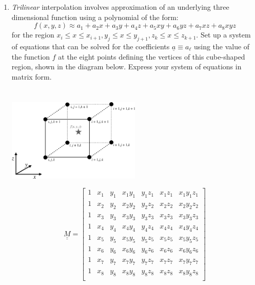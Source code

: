 \documentclass{article}
\begin{document}
\begin{enumerate}
    \pagebreak
    
    \item \emph{Trilinear} interpolation involves approximation of an underlying three dimensional function using a polynomial of the form:  
    \begin{equation}
      f(x,y,z) \approx a_1 + a_2 x + a_3 y + a_4 z + a_5 x y + a_6 y z + a_7 x z + a_8 x y z
    \end{equation}
    for the region $x_i \le x \le x_{i+1}, y_j \le x \le y_{j+1}, z_k \le x \le z_{k+1}$.  Set up a system of equations that can be solved for the coefficients $\underline{a} \equiv a_\ell$ using the value of the function $f$ at the eight points defining the vertices of this cube-shaped region, shown in the diagram below.  Express your system of equations in matrix form.  \\~\\~\\
    \includegraphics[width=0.5\textwidth]{diagram_trilinear-crop.pdf}
    
    $$\underline{\underline{M}} = 
     \begin{bmatrix}
    	1 & x_1 & y_1 & x_1 y_1 & y_1 z_1 & x_1 z_1 & x_1 y_1 z_1 \\	
    	1 & x_2 & y_2 & x_2 y_2 & y_2 z_2 & x_2 z_2 & x_2 y_2 z_2 \\
    	1 & x_3 & y_3 & x_3 y_3 & y_3 z_3 & x_3 z_3 & x_3 y_3 z_3 \\
    	1 & x_4 & y_4 & x_4 y_4 & y_4 z_4 & x_4 z_4 & x_4 y_4 z_4 \\
    	1 & x_5 & y_5 & x_5 y_5 & y_5 z_5 & x_5 z_5 & x_5 y_5 z_5 \\
    	1 & x_6 & y_6 & x_6 y_6 & y_6 z_6 & x_6 z_6 & x_6 y_6 z_6 \\
    	1 & x_7 & y_7 & x_7 y_7 & y_7 z_7 & x_7 z_7 & x_7 y_7 z_7 \\
    	1 & x_8 & y_8 & x_8 y_8 & y_8 z_8 & x_8 z_8 & x_8 y_8 z_8 \\
    \end{bmatrix}$$
    

\end{enumerate}
\end{document}
